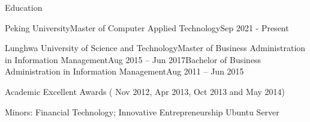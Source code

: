 \documentclass{resume} %
\begin{document}

\begin{rSection}{Education}

\begin{rCoSectionNull}{Peking University}{Master of Computer Applied Technology}{Sep 2021 - Present}{}{}

\end{rCoSectionNull}

\begin{rCoSection}{Lunghwa University of Science and Technology}{Master of Business Administration in Information Management}{Aug 2015 – Jun 2017}{Bachelor of Business Administration in Information Management}{Aug 2011 – Jun 2015}
\item Academic Excellent Awards ({ Nov 2012, Apr 2013, Oct 2013 and May 2014})
\item Minors: Financial Technology; Innovative Entrepreneurship
 Ubuntu Server 
\end{rCoSection}
\end{rSection}

\end{document}
